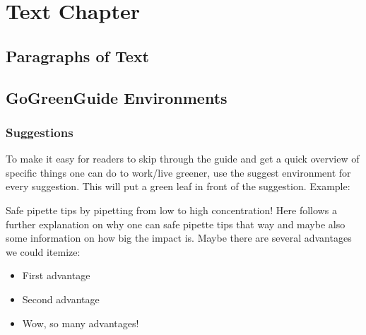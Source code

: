 	
	
	
	
	\chapter{Text Chapter}
	
	\section{Paragraphs of Text}
	
	\lipsum[1-5] %
	
	\section{GoGreenGuide Environments}
	
	\subsection{Suggestions}
	
	To make it easy for readers to skip through the guide and get a quick overview of specific things one can do to work/live greener, use the suggest environment for every suggestion. This will put a green leaf in front of the suggestion. Example:
	\begin{suggest}{Safe pipette tips by pipetting from low to high concentration!}
		Here follows a further explanation on why one can safe pipette tips that way and maybe also some information on how big the impact is. Maybe there are several advantages we could itemize:
		\begin{itemize}
			\item First advantage
			\item Second advantage
			\item Wow, so many advantages!
		\end{itemize}
	\end{suggest}
	
